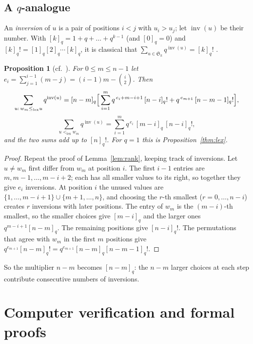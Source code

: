 \documentclass[11pt]{amsart}
\theoremstyle{plain}
\newtheorem{proposition}[theorem]{Proposition}
\theoremstyle{definition}
\theoremstyle{remark}
\newcommand{\Sym}{\mathfrak{S}}
\newcommand{\lex}{<_{\mathrm{lex}}}
\newcommand{\lexeq}{\le_{\mathrm{lex}}}
\newcommand{\inv}{\operatorname{inv}}
\newcommand{\qint}[1]{[#1]_q}
\newcommand{\qfact}[1]{[#1]_q!}
\begin{document}
\subsection{\texorpdfstring{A $q$-analogue}{A q-analogue}}
An \emph{inversion} of $u$ is a pair of positions $i<j$ with $u_i>u_j$; let
$\inv(u)$ be their number. With $\qint{k}=1+q+\dots+q^{k-1}$ (and
$\qint{0}=0$) and $\qfact{k}=\qint{1}\qint{2}\cdots\qint{k}$, it is classical
that $\sum_{u\in\Sym_k}q^{\inv(u)}=\qfact{k}$ \cite[Cor.~1.3.13]{EC1}.

\begin{proposition}[cf.\ \cite{EC1}]\label{thm:q}
For $0\le m\le n-1$ let $e_i=\sum_{j=1}^{i-1}(m-j)=(i-1)m-\binom{i}{2}$. Then
\[
  \sum_{u:\,w_m\lexeq u}q^{\inv(u)}
  =\qint{n-m}\Bigl[\,\sum_{i=1}^{m}q^{\,e_i+m-i+1}\,\qfact{n-i}+q^{\,e_{m+1}}\,\qfact{n-m-1}\Bigr],
\]
\[
  \sum_{u\lex w_m}q^{\inv(u)}=\sum_{i=1}^{m}q^{\,e_i}\,\qint{m-i}\,\qfact{n-i},
\]
and the two sums add up to $\qfact{n}$. For $q=1$ this is
Proposition~\ref{thm:lex}.
\end{proposition}

\begin{proof}
Repeat the proof of Lemma~\ref{lem:rank}, keeping track of inversions. Let
$u\neq w_m$ first differ from $w_m$ at position $i$. The first $i-1$ entries
are $m,m-1,\dots,m-i+2$; each has all smaller values to its right, so together
they give $e_i$ inversions. At position $i$ the unused values are
$\{1,\dots,m-i+1\}\cup\{m+1,\dots,n\}$, and choosing the $r$-th smallest
($r=0,\dots,n-i$) creates $r$ inversions with later positions. The entry of
$w_m$ is the $(m-i)$-th smallest, so the smaller choices give $\qint{m-i}$ and
the larger ones $q^{m-i+1}\qint{n-m}$. The remaining positions give
$\qfact{n-i}$. The permutations that agree with $w_m$ in the first $m$
positions give $q^{e_{m+1}}\qfact{n-m}=q^{e_{m+1}}\qint{n-m}\qfact{n-m-1}$.
\end{proof}

So the multiplier $n-m$ becomes $\qint{n-m}$: the $n-m$ larger choices at each
step contribute consecutive numbers of inversions.

\section{Computer verification and formal proofs}\label{app:data}
\end{document}
